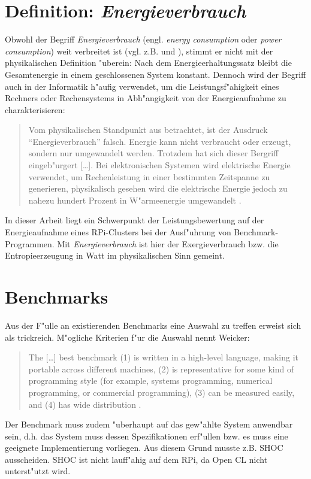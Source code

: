 \section{Definition: \textit{Energieverbrauch}}\label{Energieverbrauch}

Obwohl der Begriff \textit{Energieverbrauch} (engl. \textit{energy consumption} oder \textit{power consumption}) weit verbreitet ist (vgl. z.B. \cite{fich13} und \cite{buh08}), stimmt er nicht mit der physikalischen Definition "uberein: Nach dem Energieerhaltungssatz bleibt die Gesamtenergie in einem geschlossenen System konstant. Dennoch wird der Begriff auch in der Informatik h"aufig verwendet, um die Leistungsf"ahigkeit eines Rechners oder Rechensystems in Abh"angigkeit von der Energieaufnahme zu charakterisieren:
\begin{quote}
\onehalfspacing
Vom physikalischen Standpunkt aus betrachtet, ist der Ausdruck "`Energieverbrauch"' falsch. Energie kann nicht verbraucht oder erzeugt, sondern nur umgewandelt werden. Trotzdem hat sich dieser Bergriff eingeb"urgert [\dots]. Bei elektronischen Systemen wird elektrische Energie verwendet, um Rechenleistung in einer bestimmten Zeitspanne zu generieren, physikalisch gesehen wird die elektrische Energie jedoch zu nahezu hundert Prozent in W"armeenergie umgewandelt \cite{lan13}. 
\end{quote}
In dieser Arbeit liegt ein Schwerpunkt der Leistungsbewertung auf der Energieaufnahme eines RPi-Clusters bei der Ausf"uhrung von Benchmark-Programmen. Mit \textit{Energieverbrauch} ist hier der Exergieverbrauch bzw. die Entropieerzeugung in Watt im physikalischen Sinn gemeint.     

\section{Benchmarks}\label{Benchmarks}

Aus der F"ulle an existierenden Benchmarks eine Auswahl zu treffen erweist sich als trickreich. M"ogliche Kriterien f"ur die Auswahl nennt Weicker: 
\begin{quote}
\onehalfspacing
The [\dots] best benchmark (1) is written in a high-level language, making it portable across different machines, (2) is representative for some kind of programming style (for example, systems programming, numerical programming, or commercial programming), (3) can be measured easily, and (4) has wide distribution \cite{wei90}. 
\end{quote}
Der Benchmark muss zudem "uberhaupt auf das gew"ahlte System anwendbar sein, d.h. das System muss dessen Spezifikationen erf"ullen bzw. es muss eine geeignete Implementierung vorliegen. Aus diesem Grund musste z.B. SHOC ausscheiden. SHOC ist nicht lauff"ahig auf dem RPi, da Open CL nicht unterst"utzt wird. 


